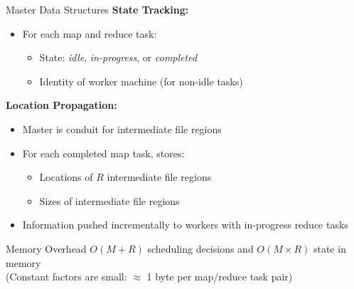 \documentclass[aspectratio=169]{beamer}
\begin{document}
\begin{frame}{Master Data Structures}
\textbf{State Tracking:}
\begin{itemize}
    \item For each map and reduce task:
    \begin{itemize}
        \item State: \textit{idle}, \textit{in-progress}, or \textit{completed}
        \item Identity of worker machine (for non-idle tasks)
    \end{itemize}
\end{itemize}

\vspace{0.3cm}

\textbf{Location Propagation:}
\begin{itemize}
    \item Master is conduit for intermediate file regions
    \item For each completed map task, stores:
    \begin{itemize}
        \item Locations of $R$ intermediate file regions
        \item Sizes of intermediate file regions
    \end{itemize}
    \item Information pushed incrementally to workers with in-progress reduce tasks
\end{itemize}

\vspace{0.3cm}

\begin{alertblock}{Memory Overhead}
$O(M + R)$ scheduling decisions and $O(M \times R)$ state in memory \\
(Constant factors are small: $\approx$ 1 byte per map/reduce task pair)
\end{alertblock}
\end{frame}
\end{document}
